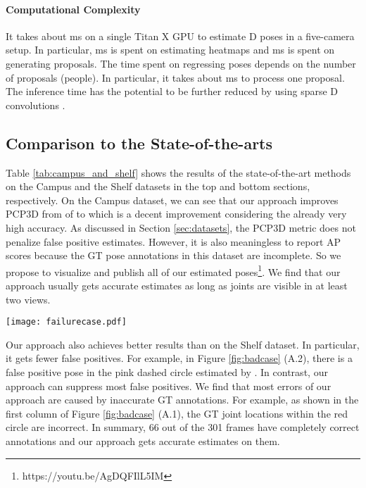 \documentclass[runningheads]{llncs}
\begin{document}
\paragraph{\textbf{Computational Complexity}}
It takes about ms on a single Titan X GPU to estimate D poses in a five-camera setup. In particular, ms is spent on estimating heatmaps and ms is spent on generating proposals. The time spent on regressing poses depends on the number of proposals (people). In particular, it takes about ms to process one proposal. The inference time has the potential to be further reduced by using sparse D convolutions \cite{yan2018second}.

\subsection{Comparison to the State-of-the-arts}
Table \ref{tab:campus_and_shelf} shows the results of the state-of-the-art methods on the Campus and the Shelf datasets in the top and bottom sections, respectively. On the Campus dataset, we can see that our approach improves PCP3D from  of \cite{dong2019fast} to  which is a decent improvement considering the already very high accuracy. As discussed in Section \ref{sec:datasets}, the PCP3D metric does not penalize false positive estimates. However, it is also meaningless to report AP scores because the GT pose annotations in this dataset are incomplete. So we propose to visualize and publish all of our estimated poses\footnote{https://youtu.be/AgDQFIlL5IM}. We find that our approach usually gets accurate estimates as long as joints are visible in at least two views. 

\begin{figure*}
	\centering
	\texttt{[image: failurecase.pdf]}
	\caption{(A) shows the D poses of ground-truth (A.1), estimated by \cite{dong2019fast} (A.2) and ours (A.3), respectively. The joints in the dashed circles represent the locations are incorrect. (B) shows two typical cases where our approach makes mistakes. The pose plotted by dashed lines in B.2 is the ground-truth.
	}
	\label{fig:badcase}
\end{figure*}

Our approach also achieves better results than \cite{dong2019fast} on the Shelf dataset. In particular, it gets fewer false positives. For example, in Figure \ref{fig:badcase} (A.2), there is a false positive pose in the pink dashed circle estimated by \cite{dong2019fast}. In contrast, our approach can suppress most false positives. We find that most errors of our approach are caused by inaccurate GT annotations. For example, as shown in the first column of Figure \ref{fig:badcase} (A.1), the GT joint locations within the red circle are incorrect. In summary, 66 out of the 301 frames have completely correct annotations and our approach gets accurate estimates on them.
\end{document}
